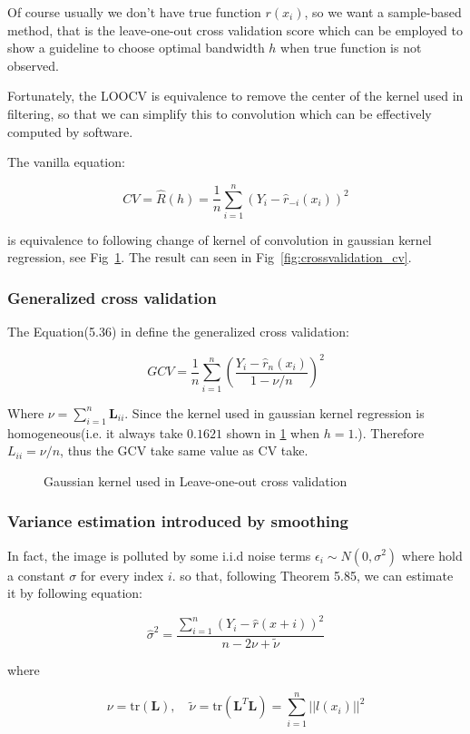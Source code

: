 \documentclass{beamer}
\begin{document}
\begin{frame}
  Of course usually we don't have true function $r(x_i)$, so we want a sample-based method, 
  that is the leave-one-out cross validation score which can be employed to show a guideline to choose optimal bandwidth $h$
  when true function is not observed.
  
  Fortunately, the LOOCV is equivalence to remove the center of the kernel used in filtering, so that we can simplify this to 
  convolution which can be effectively computed by software.
  
  The vanilla equation:
  
  $$
  CV = \hat{R}(h)=\frac{1}{n}\sum_{i=1}^n (Y_i-\hat{r}_{-i}(x_i))^2
  $$
  
  is equivalence to following change of kernel of convolution in gaussian kernel regression, see Fig~\ref{fig:gaussian_kernel}. 
  The result can seen in Fig~\ref{fig:crossvalidation_cv}.  

\end{frame}

\begin{frame}
  \frametitle{Generalized cross validation}
  The Equation(5.36) in \cite{wasserman2006all} define the generalized cross validation:

  $$
  GCV = \frac{1}{n}\sum_{i=1}^n \left(\frac{Y_i-\hat{r}_n(x_i)}{1-\nu/n}\right)^2
  $$
  
  Where $\nu = \sum_{i=1}^n \mathbf{L}_{ii}$. Since the kernel used in gaussian kernel regression is homogeneous(i.e. it always take $0.1621$
  shown in \ref{fig:gaussian_kernel} when $h=1$.). Therefore $L_{ii} = \nu/n$, thus the GCV take same value as CV take. 
  
  \begin{figure}[htb]
    \centering
    \scalebox{.6}{}
    \caption{Gaussian kernel used in Leave-one-out cross validation}
    \label{fig:gaussian_kernel}
  \end{figure}
  

\end{frame}

\begin{frame}
  \frametitle{Variance estimation introduced by smoothing}

  In fact, the image is polluted by some i.i.d noise terms $\epsilon_i \sim N(0,\sigma^2)$ where hold a constant $\sigma$ for every index $i$.
  so that, following \cite{wasserman2006all} Theorem 5.85, we can estimate it by following equation:
  
  $$
  \hat{\sigma}^2=\frac{\sum_{i=1}^n (Y_i-\hat{r}(x+i))^2}{n-2\nu+\tilde{\nu}}
  $$
  
  where
  
  $$
  \nu = \mathrm{tr}(\mathbf{L}), \quad 
  \tilde{\nu}=\mathrm{tr}(\mathbf{L}^T\mathbf{L})=\sum_{i=1}^n||l(x_i)||^2
  $$  

\end{frame}
\end{document}
